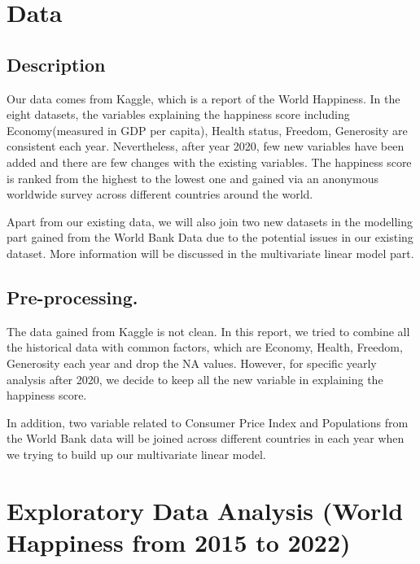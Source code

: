 \documentclass[11pt,a4paper,]{article}
\begin{document}
\hypertarget{data}{%
\section{Data}\label{data}}

\hypertarget{description}{%
\subsection{Description}\label{description}}

Our data comes from Kaggle, which is a report of the World Happiness. In the eight datasets, the variables explaining the happiness score including Economy(measured in GDP per capita), Health status, Freedom, Generosity are consistent each year. Nevertheless, after year 2020, few new variables have been added and there are few changes with the existing variables. The happiness score is ranked from the highest to the lowest one and gained via an anonymous worldwide survey across different countries around the world.

Apart from our existing data, we will also join two new datasets in the modelling part gained from the World Bank Data due to the potential issues in our existing dataset. More information will be discussed in the multivariate linear model part.

\hypertarget{pre-processing.}{%
\subsection{Pre-processing.}\label{pre-processing.}}

The data gained from Kaggle is not clean. In this report, we tried to combine all the historical data with common factors, which are Economy, Health, Freedom, Generosity each year and drop the NA values. However, for specific yearly analysis after 2020, we decide to keep all the new variable in explaining the happiness score.

In addition, two variable related to Consumer Price Index and Populations from the World Bank data will be joined across different countries in each year when we trying to build up our multivariate linear model.

\hypertarget{exploratory-data-analysis-world-happiness-from-2015-to-2022}{%
\section{Exploratory Data Analysis (World Happiness from 2015 to 2022)}\label{exploratory-data-analysis-world-happiness-from-2015-to-2022}}
\end{document}
